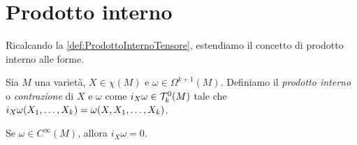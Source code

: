 \section{Prodotto interno}

Ricalcando la \cref{def:ProdottoInternoTensore}, estendiamo il concetto di prodotto interno alle forme.
\begin{definition}
	Sia $M$ una varietà, $X\in\chi(M)$ e $\omega\in\Omega^{k+1}(M)$. Definiamo il \emph{prodotto interno} o \emph{contrazione} di $X$ e $\omega$ come $i_X\omega \in \Tau_k^0(M)$ tale che $i_X\omega(\seqb Xk,) = \omega(X,\seqb Xk,)$. %
\end{definition}

\begin{remark}
	Se $\omega\in C^\infty(M)$, allora $i_X\omega = 0$.
\end{remark}

